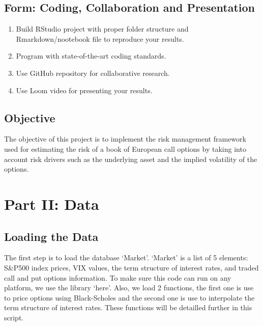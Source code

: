 \documentclass[]{article}
\providecommand{\tightlist}{%
  \setlength{\itemsep}{0pt}\setlength{\parskip}{0pt}}
\begin{document}
\hypertarget{form-coding-collaboration-and-presentation}{%
\subsection{Form: Coding, Collaboration and
Presentation}\label{form-coding-collaboration-and-presentation}}

\begin{enumerate}
\def\labelenumi{\arabic{enumi}.}
\tightlist
\item
  Build RStudio project with proper folder structure and
  Rmarkdown/nootebook file to reproduce your results.\\
\item
  Program with state-of-the-art coding standards.\\
\item
  Use GitHub repository for collaborative research.\\
\item
  Use Loom video for presenting your results.
\end{enumerate}

\hypertarget{objective}{%
\subsection{Objective}\label{objective}}

The objective of this project is to implement the risk management
framework used for estimating the risk of a book of European call
options by taking into account risk drivers such as the underlying asset
and the implied volatility of the options.

\hypertarget{part-ii-data}{%
\section{Part II: Data}\label{part-ii-data}}

\hypertarget{loading-the-data}{%
\subsection{Loading the Data}\label{loading-the-data}}

The first step is to load the database `Market'. `Market' is a list of 5
elements: S\&P500 index prices, VIX values, the term structure of
interest rates, and traded call and put options information. To make
sure this code can run on any platform, we use the library `here'. Also,
we load 2 functions, the first one is use to price options using
Black-Scholes and the second one is use to interpolate the term
structure of interest rates. These functions will be detailled further
in this script.
\end{document}
